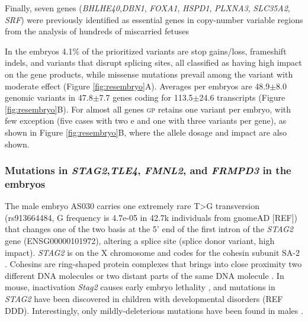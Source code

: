 \documentclass[fleqn,10pt]{wlscirep}
\newcommand{\gp}[]{\textsc{gp }}
\begin{document}
Finally, seven genes (\textit{BHLHE40},\textit{DBN1}, \textit{FOXA1}, \textit{HSPD1}, \textit{PLXNA3}, \textit{SLC35A2}, \textit{SRF}) were previously identified as essential genes in copy-number variable regions from the analysis of hundreds of miscarried fetuses \cite{chen2017characterization} %

In the embryos 4.1\% of the prioritized variants are stop gains/loss, frameshift indels, and variants that disrupt splicing sites, all classified as having high impact on the gene products, while missense mutations prevail among the variant with moderate effect (Figure \ref{fig:resembryo}A). Averages per embryos are 48.9$\pm$8.0 genomic variants in 47.8$\pm$7.7 genes coding for 113.5$\pm$24.6 transcripts (Figure \ref{fig:resembryo}B). For almost all genes \gp retains one variant per embryo, with few exception (five cases with two e and one with three variants per gene), as shown in Figure \ref{fig:resembryo}B, where the allele dosage and impact are also shown. %

\subsubsection*{Mutations in \textit{STAG2},\textit{TLE4}, \textit{FMNL2}, and \textit{FRMPD3} in the embryos} 
The male embryo AS030 carries one extremely rare T>G transversion (rs913664484, G frequency is 4.7e-05 in 42.7k individuals from gnomeAD [REF]) that changes one of the two basis at the 5' end of the first intron of the \textit{STAG2} gene (ENSG00000101972), altering a splice site (splice donor variant, high impact). \textit{STAG2} is on the X chromosome and codes for the cohesin subunit SA-2 \cite{cuadrado2020specialized}. Cohesins are ring-shaped protein complexes that brings into close proximity two different DNA molecules or two distant parts of the same DNA molecule \cite{mcnicoll2013cohesin}. In mouse, inactivation \textit{Stag2} causes early embryo lethality \cite{de2020essential}, and  mutations in \textit{STAG2} have been discovered in children with developmental disorders (REF DDD). Interestingly, only mildly-deleterious mutations have been found in males \cite{mullegama2019mutations}. 
\end{document}
